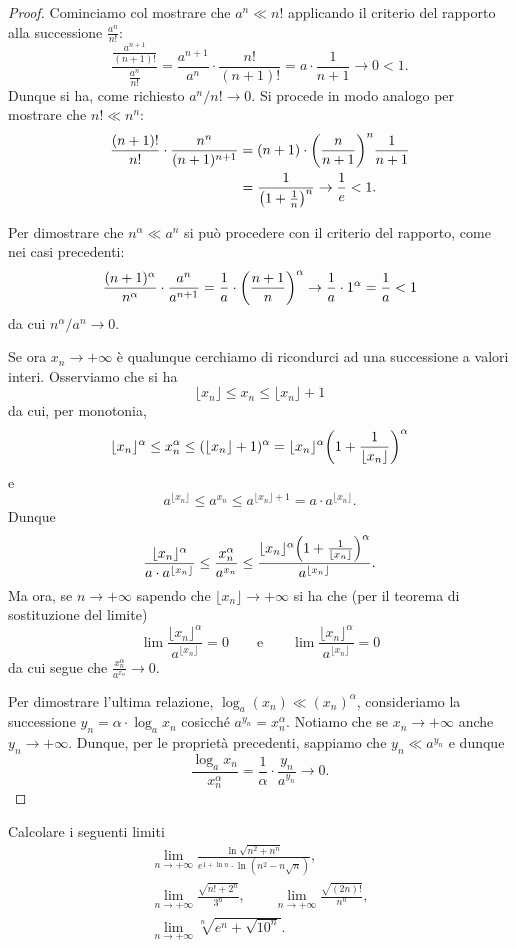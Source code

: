 \begin{proof}
\mymark{**}
Cominciamo col mostrare che $a^n \ll n!$
applicando il criterio del rapporto alla successione $\frac{a^n}{n!}$:
\[
\frac{\displaystyle \frac{a^{n+1}}{(n+1)!}}{\displaystyle \frac{a^n}{n!}}
= \frac{a^{n+1}}{a^n}\cdot \frac{n!}{(n+1)!}
= a \cdot \frac {1}{n + 1} \to 0 < 1.
\]
Dunque si ha, come richiesto $a^n / n! \to 0$.
Si procede in modo analogo per mostrare che $n! \ll n^n$:
\begin{align*}
\frac{(n+1)!}{n!}\cdot \frac{n^n}{(n+1)^{n+1}}
&= (n+1) \cdot {\left( \frac{n}{n+1} \right)}^n \frac {1}{n+1}\\
&= \frac{1}{{\left( 1+\frac 1 n \right)}^n} \to \frac 1 e < 1.
\end{align*}

Per dimostrare che
$n^\alpha \ll a^n$
si può procedere con il criterio del rapporto, come nei casi precedenti:
\[
\frac{(n+1)^\alpha}{n^\alpha}\cdot \frac{a^n}{a^{n+1}}
= \frac 1 a \cdot {\left( \frac{n+1}{n} \right)}^\alpha \to \frac 1 a \cdot 1^\alpha = \frac 1 a < 1
\]
da cui $n^\alpha / a^n \to 0$.

Se ora $x_n\to +\infty$ è qualunque
cerchiamo di ricondurci ad una successione a valori interi.
Osserviamo che si ha
\[
\lfloor x_n \rfloor
\le x_n
\le \lfloor x_n \rfloor + 1
\]
da cui, per monotonia,
\[
\lfloor x_n \rfloor^\alpha
\le x_n^\alpha
\le (\lfloor x_n \rfloor + 1)^\alpha
= \lfloor x_n \rfloor^\alpha {\left( 1+ \frac{1}{\lfloor x_n \rfloor} \right)}^\alpha
\]
e
\[
a^{\lfloor x_n \rfloor}
\le a^{x_n}
\le a^{\lfloor x_n \rfloor + 1}
= a \cdot a^{\lfloor x_n \rfloor}.
\]
Dunque
\[
\frac{\lfloor x_n \rfloor^\alpha}{a \cdot a^{\lfloor x_n \rfloor}}
\le \frac{x_n^\alpha}{a^{x_n}}
\le \frac{\lfloor x_n \rfloor^\alpha {\left( 1+ \frac{1}{\lfloor x_n \rfloor} \right)}^\alpha}
    {a^{\lfloor x_n \rfloor}}.
\]
Ma ora, se $n\to +\infty$ sapendo che $\lfloor x_n\rfloor \to +\infty$ si ha
che (per il teorema di sostituzione del limite)
\[
\lim \frac{\lfloor x_n \rfloor^\alpha}{a^{\lfloor x_n \rfloor}} = 0
\qquad
\text{e}
\qquad
\lim \frac{\lfloor x_n \rfloor^\alpha }
    {a^{\lfloor x_n \rfloor}} = 0
\]
da cui segue che $\frac{x_n^\alpha}{a^{x_n}}\to 0$.

Per dimostrare l'ultima relazione, $\log_a(x_n)\ll (x_n)^\alpha$,
consideriamo la successione $y_n = \alpha \cdot \log_a x_n$
cosicché $a^{y_n} = x_n^\alpha$.
Notiamo che se $x_n\to +\infty$
anche $y_n \to +\infty$.
Dunque, per le proprietà precedenti,
sappiamo che $y_n \ll a^{y_n}$ e dunque
\[
\frac{\log_a x_n}{x_n^\alpha}
= \frac{1}{\alpha}\cdot\frac{y_n}{a^{y_n}} \to 0.
\]
\end{proof}

\begin{exercise}
Calcolare i seguenti limiti
\begin{gather*}
  \lim_{n\to +\infty} \frac{\displaystyle \ln\sqrt{n^2+n^n}}
  {\displaystyle e^{1 + \ln n}\cdot \ln(n^2-n\sqrt n)}, \\
  \lim_{n\to +\infty} \frac{\sqrt{n! + 2^n}}{3^n}, \qquad
  \lim_{n\to +\infty} \frac{\sqrt{(2n)!}}{n^n}, \\
  \lim_{n\to +\infty} \sqrt[n]{e^n + \sqrt{10^n}}.
\end{gather*}
\end{exercise}
